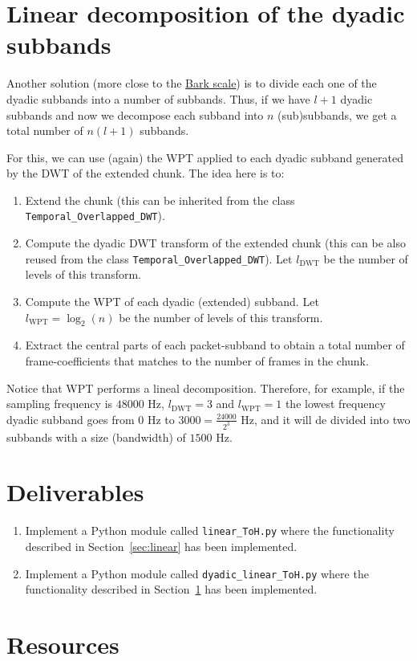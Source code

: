 \section{Linear decomposition of the dyadic subbands}
\label{sec:dyadic-linear}
Another solution (more close to the
\href{https://en.wikipedia.org/wiki/Bark_scale}{Bark scale}) is to
divide each one of the dyadic subbands into a number of
subbands. Thus, if we have $l+1$ dyadic subbands and now we decompose
each subband into $n$ (sub)subbands, we get a total number of $n(l+1)$
subbands.

For this, we can use (again) the WPT applied to each dyadic subband
generated by the DWT of the extended chunk. The idea here is to:
\begin{enumerate}
\item Extend the chunk (this can be inherited from the class
  \verb|Temporal_Overlapped_DWT|).
\item Compute the dyadic DWT transform of the extended chunk (this can
  be also reused from the class \verb|Temporal_Overlapped_DWT|). Let
  $l_{\text{DWT}}$ be the number of levels of this transform.
\item Compute the WPT of each dyadic (extended) subband. Let
  $l_{\text{WPT}}=\log_2(n)$ be the number of levels of this
  transform.
\item Extract the central parts of each packet-subband to obtain a
  total number of frame-coefficients that matches to the number of frames in
  the chunk.
\end{enumerate}
  
Notice that WPT performs a lineal decomposition. Therefore, for
example, if the sampling frequency is $48000$ Hz, $l_{\text{DWT}}=3$
and $l_{\text{WPT}}=1$ the lowest frequency dyadic subband goes from
$0$ Hz to $3000=\frac{24000}{2^3}$ Hz, and it will de divided into two
subbands with a size (bandwidth) of $1500$ Hz.

\section{Deliverables}

\begin{enumerate}
\item Implement a Python module called \verb|linear_ToH.py| where the
  functionality described in Section~\ref{sec:linear} has been
  implemented.
\item Implement a Python module called \verb|dyadic_linear_ToH.py|
  where the functionality described in Section~\ref{sec:dyadic-linear}
  has been implemented.
\end{enumerate}

\section{Resources}




